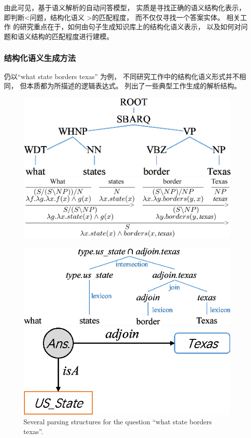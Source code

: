 由此可见，基于语义解析的自动问答模型，
实质是寻找正确的语义结构化表示，
即判断\textless 问题，结构化语义 \textgreater 的匹配程度，
而不仅仅寻找一个答案实体。
相关工作
\parencite{kwiatkowski2013scaling,berant2013semantic,yih2015semantic,bao2016constraint}
的研究重点在于，如何由句子生成知识库上的结构化语义表示，
以及如何对问题和语义结构的匹配程度进行建模。


\subsubsection{结构化语义生成方法}   %


仍以``what state borders texas'' 为例，
不同研究工作中的结构化语义形式并不相同，
但本质都为所描述的逻辑表达式。
列出了一些典型工作生成的解析结构。

\begin{figure}[!htp]
  \centering
    {\includegraphics[width=0.48\columnwidth]{figure/rw/qa-parsing-xs.eps}}
  \hspace{1em}
    {\includegraphics[width=0.48\columnwidth]{figure/rw/qa-ccg-3.png}}

  \vspace{1em}

    {\includegraphics[width=0.48\columnwidth]{figure/rw/qa-dcs-xs.eps}}
  \hspace{3em}
    {\includegraphics[width=0.38\columnwidth]{figure/rw/qa-stagg-xs.eps}}
            {Several parsing structures for the question ``what state borders texas''.}
  \label{fig:rw-spt}
\end{figure}

